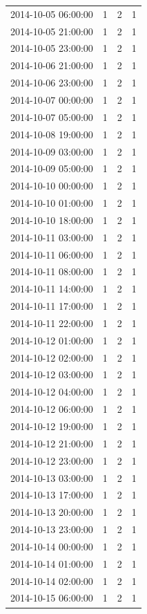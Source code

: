 \begin{tabular}{lrrr}
2014-10-05 06:00:00 & 1 & 2 & 1 \\
2014-10-05 21:00:00 & 1 & 2 & 1 \\
2014-10-05 23:00:00 & 1 & 2 & 1 \\
2014-10-06 21:00:00 & 1 & 2 & 1 \\
2014-10-06 23:00:00 & 1 & 2 & 1 \\
2014-10-07 00:00:00 & 1 & 2 & 1 \\
2014-10-07 05:00:00 & 1 & 2 & 1 \\
2014-10-08 19:00:00 & 1 & 2 & 1 \\
2014-10-09 03:00:00 & 1 & 2 & 1 \\
2014-10-09 05:00:00 & 1 & 2 & 1 \\
2014-10-10 00:00:00 & 1 & 2 & 1 \\
2014-10-10 01:00:00 & 1 & 2 & 1 \\
2014-10-10 18:00:00 & 1 & 2 & 1 \\
2014-10-11 03:00:00 & 1 & 2 & 1 \\
2014-10-11 06:00:00 & 1 & 2 & 1 \\
2014-10-11 08:00:00 & 1 & 2 & 1 \\
2014-10-11 14:00:00 & 1 & 2 & 1 \\
2014-10-11 17:00:00 & 1 & 2 & 1 \\
2014-10-11 22:00:00 & 1 & 2 & 1 \\
2014-10-12 01:00:00 & 1 & 2 & 1 \\
2014-10-12 02:00:00 & 1 & 2 & 1 \\
2014-10-12 03:00:00 & 1 & 2 & 1 \\
2014-10-12 04:00:00 & 1 & 2 & 1 \\
2014-10-12 06:00:00 & 1 & 2 & 1 \\
2014-10-12 19:00:00 & 1 & 2 & 1 \\
2014-10-12 21:00:00 & 1 & 2 & 1 \\
2014-10-12 23:00:00 & 1 & 2 & 1 \\
2014-10-13 03:00:00 & 1 & 2 & 1 \\
2014-10-13 17:00:00 & 1 & 2 & 1 \\
2014-10-13 20:00:00 & 1 & 2 & 1 \\
2014-10-13 23:00:00 & 1 & 2 & 1 \\
2014-10-14 00:00:00 & 1 & 2 & 1 \\
2014-10-14 01:00:00 & 1 & 2 & 1 \\
2014-10-14 02:00:00 & 1 & 2 & 1 \\
2014-10-15 06:00:00 & 1 & 2 & 1 \\

\end{tabular}
